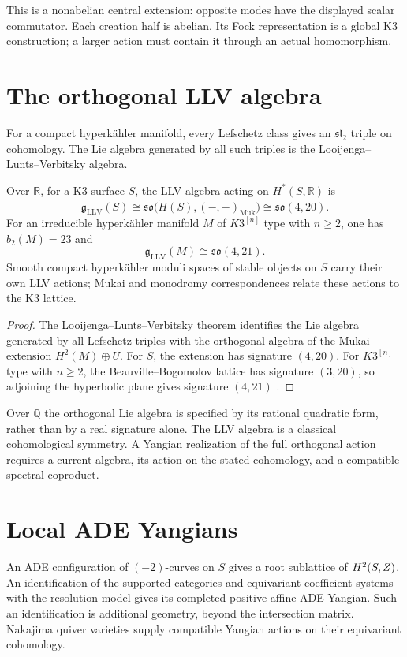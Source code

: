 This is a nonabelian central extension: opposite modes have the
displayed scalar commutator. Each creation half is abelian. Its Fock
representation is a global K3 construction; a larger action must
contain it through an actual homomorphism.

\section{The orthogonal LLV algebra}
For a compact hyperkähler manifold, every Lefschetz class gives an $\mathfrak{sl}_2$ triple on cohomology. The Lie algebra generated by all such triples is the Looijenga--Lunts--Verbitsky algebra.

\begin{theorem}
Over $\mathbb R$, for a K3 surface $S$, the LLV algebra acting on
$H^*(S,\mathbb R)$ is
\[
 \mathfrak g_{\mathrm{LLV}}(S)
 \cong\mathfrak{so}\bigl(\widetilde H(S),(-,-)_{\mathrm{Muk}}\bigr)
 \cong\mathfrak{so}(4,20).
\]
For an irreducible hyperk\"ahler manifold $M$ of $K3^{[n]}$ type with $n\ge2$, one has $b_2(M)=23$ and
\[
 \mathfrak g_{\mathrm{LLV}}(M)\cong\mathfrak{so}(4,21).
\]
Smooth compact hyperk\"ahler moduli spaces of stable objects on $S$ carry their own LLV actions; Mukai and monodromy correspondences relate these actions to the K3 lattice.
\end{theorem}
\begin{proof}
The Looijenga--Lunts--Verbitsky theorem identifies the Lie algebra generated by all Lefschetz triples with the orthogonal algebra of the Mukai extension $H^2(M)\oplus U$. For $S$, the extension has signature $(4,20)$. For $K3^{[n]}$ type with $n\ge2$, the Beauville--Bogomolov lattice has signature $(3,20)$, so adjoining the hyperbolic plane gives signature $(4,21)$ \cite{LooijengaLunts,Verbitsky96}.
\end{proof}

Over $\mathbb Q$ the orthogonal Lie algebra is specified by its
rational quadratic form, rather than by a real signature alone.
The LLV algebra is a classical cohomological symmetry. A Yangian realization of the full orthogonal action requires a current algebra, its action on the stated cohomology, and a compatible spectral coproduct.

\section{Local ADE Yangians}
An ADE configuration of $(-2)$-curves on $S$ gives a root sublattice of $H^2(S,Z)$. An identification of the supported categories and equivariant
coefficient systems with the resolution model gives its completed
positive affine ADE Yangian. Such an identification is additional
geometry, beyond the intersection matrix. Nakajima quiver varieties supply compatible Yangian actions on their equivariant cohomology.

